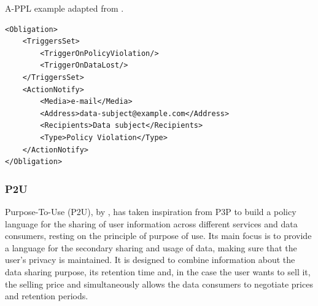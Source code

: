 \begin{listing}
\caption{A-PPL example adapted from \cite{azraoui_appl_2014}.}
\label{list:appl_example}
\begin{verbatim}
<Obligation>
    <TriggersSet>
        <TriggerOnPolicyViolation/>
        <TriggerOnDataLost/>
    </TriggersSet>
    <ActionNotify>
        <Media>e-mail</Media>
        <Address>data-subject@example.com</Address>
        <Recipients>Data subject</Recipients>
        <Type>Policy Violation</Type>
    </ActionNotify>
</Obligation>
\end{verbatim}
\end{listing}

\subsubsection{P2U}
\label{sec:p2u}
Purpose-To-Use (P2U), by \cite{iyilade_p2u_2014}, has taken inspiration from P3P to build a policy language for the sharing of user information across different services and data consumers, resting on the principle of purpose of use.
Its main focus is to provide a language for the secondary sharing and usage of data, making sure that the user's privacy is maintained.
It is designed to combine information about the data sharing purpose, its retention time and, in the case the user wants to sell it, the selling price and simultaneously allows the data consumers to negotiate prices and retention periods.

